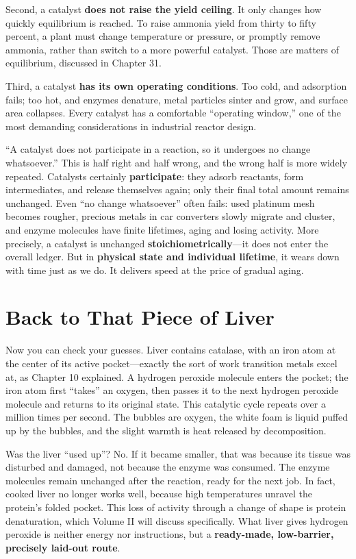 Second, a catalyst \textbf{does not raise the yield ceiling}. It only changes how quickly equilibrium is reached. To raise ammonia yield from thirty to fifty percent, a plant must change temperature or pressure, or promptly remove ammonia, rather than switch to a more powerful catalyst. Those are matters of equilibrium, discussed in Chapter 31.

Third, a catalyst \textbf{has its own operating conditions}. Too cold, and adsorption fails; too hot, and enzymes denature, metal particles sinter and grow, and surface area collapses. Every catalyst has a comfortable ``operating window,'' one of the most demanding considerations in industrial reactor design.

\begin{wuqu}
``A catalyst does not participate in a reaction, so it undergoes no change whatsoever.'' This is half right and half wrong, and the wrong half is more widely repeated. Catalysts certainly \textbf{participate}: they adsorb reactants, form intermediates, and release themselves again; only their final total amount remains unchanged. Even ``no change whatsoever'' often fails: used platinum mesh becomes rougher, precious metals in car converters slowly migrate and cluster, and enzyme molecules have finite lifetimes, aging and losing activity. More precisely, a catalyst is unchanged \textbf{stoichiometrically}---it does not enter the overall ledger. But in \textbf{physical state and individual lifetime}, it wears down with time just as we do. It delivers speed at the price of gradual aging.
\end{wuqu}

\section{Back to That Piece of Liver}

Now you can check your guesses. Liver contains catalase, with an iron atom at the center of its active pocket---exactly the sort of work transition metals excel at, as Chapter 10 explained. A hydrogen peroxide molecule enters the pocket; the iron atom first ``takes'' an oxygen, then passes it to the next hydrogen peroxide molecule and returns to its original state. This catalytic cycle repeats over a million times per second. The bubbles are oxygen, the white foam is liquid puffed up by the bubbles, and the slight warmth is heat released by decomposition.

Was the liver ``used up''? No. If it became smaller, that was because its tissue was disturbed and damaged, not because the enzyme was consumed. The enzyme molecules remain unchanged after the reaction, ready for the next job. In fact, cooked liver no longer works well, because high temperatures unravel the protein's folded pocket. This loss of activity through a change of shape is protein denaturation, which Volume II will discuss specifically. What liver gives hydrogen peroxide is neither energy nor instructions, but a \textbf{ready-made, low-barrier, precisely laid-out route}.

